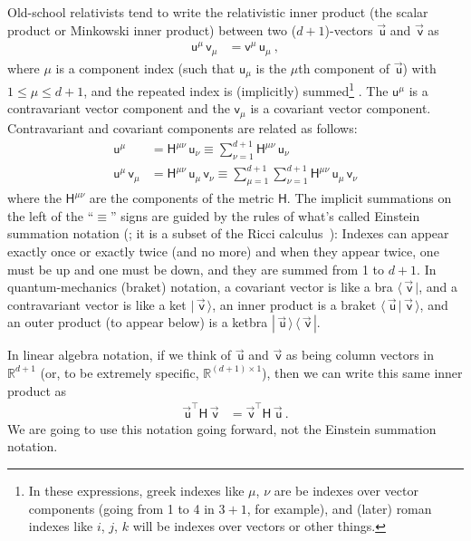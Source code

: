 \documentclass{article}
\newcommand{\metric}{\mathsf{H}}
\newcommand\upvec[1]{\!\vec{\,\mathrm{#1}}}
\newcommand{\Lvec}[1]{\upvec{\mathsf{#1}}} %
\newcommand{\Lblank}[1]{\mathsf{#1}} %
\newcommand{\bra}[1]{\langle\,{#1}\,|}
\newcommand{\ket}[1]{|\,{#1}\,\rangle}
\newcommand{\braket}[2]{\langle\,{#1}\,|\,{#2}\,\rangle}
\newcommand{\ketbra}[2]{|\,{#1}\,\rangle\,\langle\,{#2}\,|}
\newcommand{\plus}{\!+\!} %
\begin{document}
Old-school relativists tend to write the relativistic inner product (the scalar product or Minkowski inner product) between two ($d\plus1$)-vectors $\Lvec{u}$ and $\Lvec{v}$ as
\begin{align}
    \Lblank{u}^\mu\,\Lblank{v}_\mu &= \Lblank{v}^\mu\,\Lblank{u}_\mu ~,
\end{align}
where $\mu$ is a component index (such that $\Lblank{u}_\mu$ is the $\mu$th component of $\Lvec{u}$) with $1\leq\mu\leq d+1$, and the repeated index is (implicitly) summed\footnote{%
In these expressions, greek indexes like $\mu$, $\nu$ are be indexes over vector components (going from 1 to 4 in $3\plus1$, for example), and (later) roman indexes like $i$, $j$, $k$ will be indexes over vectors or other things.} .
The $\Lblank{u}^\mu$ is a contravariant vector component and the $\Lblank{v}_\mu$ is a covariant vector component.
Contravariant and covariant components are related as follows:
\begin{align}
    \Lblank{u}^\mu &= \metric^{\mu\nu}\,\Lblank{u}_\nu \equiv \sum_{\nu=1}^{d+1} \metric^{\mu\nu}\,\Lblank{u}_\nu
    \\
    \Lblank{u}^\mu\,\Lblank{v}_\mu &= \metric^{\mu\nu}\,\Lblank{u}_\mu\,\Lblank{v}_\nu \equiv \sum_{\mu=1}^{d+1}\sum_{\nu=1}^{d+1} \metric^{\mu\nu}\,\Lblank{u}_\mu\,\Lblank{v}_\nu
\end{align}
where the $\metric^{\mu\nu}$ are the components of the metric $\metric$.
The implicit summations on the left of the ``$\equiv$'' signs are guided by the rules of what's called Einstein summation notation (\cite{summation}; it is a subset of the Ricci calculus~\cite{ricci}): Indexes can appear exactly once or exactly twice (and no more) and when they appear twice, one must be up and one must be down, and they are summed from 1 to $d+1$.
In quantum-mechanics (braket) notation, a covariant vector is like a bra $\bra{\Lvec{v}}$, and a contravariant vector is like a ket $\ket{\Lvec{v}}$,
an inner product is a braket $\braket{\Lvec{u}}{\Lvec{v}}$, and an outer product (to appear below) is a ketbra $\ketbra{\Lvec{u}}{\Lvec{v}}$.

In linear algebra notation, if we think of $\Lvec{u}$ and $\Lvec{v}$ as being column vectors in $\mathbb{R}^{d+1}$ (or, to be extremely specific, $\mathbb{R}^{(d+1)\times 1}$), then we can write this same inner product as
\begin{align}\label{eq:inner}
    \Lvec{u}^\top\metric\,\Lvec{v} &= \Lvec{v}^\top\metric\,\Lvec{u} ~.
\end{align}
We are going to use this notation going forward, not the Einstein summation notation.
\end{document}
